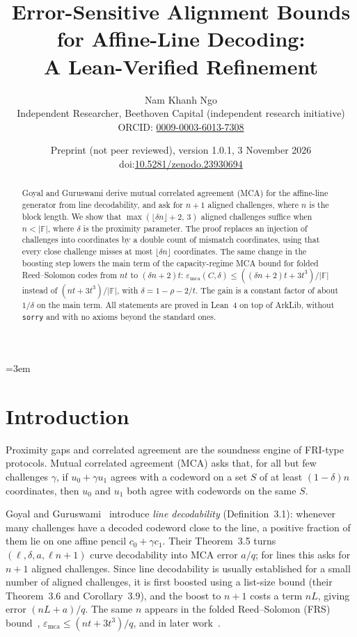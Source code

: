 \documentclass[11pt]{article}
\title{Error-Sensitive Alignment Bounds for Affine-Line Decoding:\\ A Lean-Verified Refinement}
\author{Nam Khanh Ngo\\ Independent Researcher, Beethoven Capital (independent research initiative)\\
\small ORCID: \href{https://orcid.org/0009-0003-6013-7308}{0009-0003-6013-7308}}
\date{Preprint (not peer reviewed), version 1.0.1, 3 November 2026\\
\small doi:\href{https://doi.org/10.5281/zenodo.23930694}{10.5281/zenodo.23930694}}
\theoremstyle{definition}
\theoremstyle{remark}
\newcommand{\F}{\mathbb{F}}
\newcommand{\mca}{\varepsilon_{\mathrm{mca}}}
\begin{document}
\sloppy\emergencystretch=3em
\maketitle

\begin{abstract}
Goyal and Guruswami derive mutual correlated agreement (MCA) for the affine-line generator from
line decodability, and ask for $n+1$ aligned challenges, where $n$ is the block length. We show
that $\max(\lfloor\delta n\rfloor+2,\,3)$ aligned challenges suffice when $n<|\F|$, where $\delta$
is the proximity parameter. The proof replaces an injection of challenges into coordinates by a
double count of mismatch coordinates, using that every close challenge misses at most
$\lfloor\delta n\rfloor$ coordinates. The same change in the boosting step lowers the main term of
the capacity-regime MCA bound for folded Reed--Solomon codes from $nt$ to $(\delta n+2)t$:
$\mca(C,\delta)\le((\delta n+2)t+3t^3)/|\F|$ instead of $(nt+3t^3)/|\F|$, with
$\delta=1-\rho-2/t$. The gain is a constant factor of about $1/\delta$ on the main term. All
statements are proved in Lean~4 on top of ArkLib, without \texttt{sorry} and with no axioms
beyond the standard ones.
\end{abstract}

\section{Introduction}

Proximity gaps and correlated agreement are the soundness engine of FRI-type protocols. Mutual
correlated agreement (MCA) asks that, for all but few challenges $\gamma$, if $u_0+\gamma u_1$
agrees with a codeword on a set $S$ of at least $(1-\delta)n$ coordinates, then $u_0$ and $u_1$
both agree with codewords on the same $S$.

Goyal and Guruswami~\cite{GG25} introduce \emph{line decodability} (Definition~3.1): whenever many
challenges have a decoded codeword close to the line, a positive fraction of them lie on one
affine pencil $c_0+\gamma c_1$. Their Theorem~3.5 turns $(\ell,\delta,a,\ell n+1)$ curve
decodability into MCA error $a/q$; for lines this asks for $n+1$ aligned challenges. Since line
decodability is usually established for a small number of aligned challenges, it is first boosted
using a list-size bound (their Theorem~3.6 and Corollary~3.9), and the boost to $n+1$ costs a term
$nL$, giving error $(nL+a)/q$. The same $n$ appears in the folded Reed--Solomon (FRS)
bound~\cite[Corollary~4.10]{GG25}, $\mca\le(nt+3t^3)/q$, and in later work~\cite{AGG26}.
\end{document}
